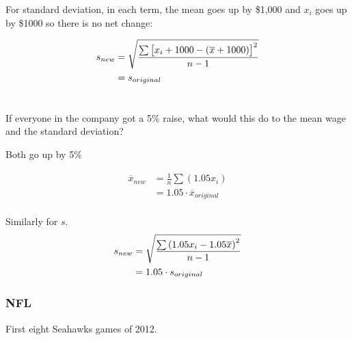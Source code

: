 \documentclass{exam}
\newcommand*\mean[1]{\overline{#1}}
\begin{document}
\begin{enumerate}
\begin{parts}
\begin{solution}
            For standard deviation, in each term, the mean goes up by \$1,000 and $x_i$
            goes up by \$1000 so there is no net change:

            \begin{align*}
              s_{new} & = \sqrt{ \frac{\sum \sbr{ x_i + 1000 - ( \mean{x} + 1000 ) }^2 }{ n - 1 } } \\
                      & = s_{original} \\
            \end{align*}

          \end{solution}

        \part{}
          If everyone in the company got a 5\% raise, what would this do to the mean wage
          and the standard deviation?

          \begin{solution}
            Both go up by 5\%

            \begin{align*}
              \mean{x}_{new} & = \frac{1}{n} \sum (1.05 x_i) \\
                             & = 1.05 \cdot \mean{x}_{original} \\
            \end{align*}

            Similarly for $s$.
            \begin{align*}
              s_{new} & = \sqrt{ \frac{\sum \del{ 1.05 x_i - 1.05 \mean{x} }^2}{ n - 1 } } \\
                      & = 1.05 \cdot s_{original} \\
            \end{align*}

          \end{solution}

      \end{parts}

  \end{enumerate}

  \newpage

  \section{NFL}

  First eight Seahawks games of 2012.
\end{document}
